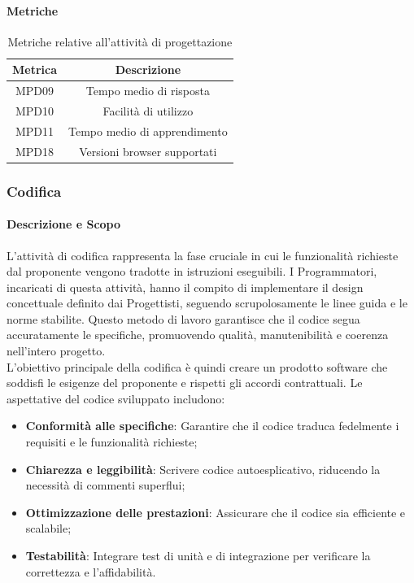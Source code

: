 \documentclass[10pt]{article}
\begin{document}
\begin{justify}
        \paragraph{Metriche}
        \begin{table}[H]
          \centering
          \begin{tabular}{|c|c|}
            \hline
            \textbf{Metrica} & \textbf{Descrizione} \\
            \hline
            MPD09 & Tempo medio di risposta\\
            \hline
            MPD10 & Facilità di utilizzo\\
            \hline
            MPD11 & Tempo medio di apprendimento\\
            \hline
            MPD18 & Versioni browser supportati\\
            \hline
          \end{tabular}
          \caption{Metriche relative all'attività di progettazione}
        \end{table}

    \subsubsection{Codifica}
    \label{codifica}
        \paragraph{Descrizione e Scopo}
        L'attività di codifica rappresenta la fase cruciale in cui le funzionalità richieste dal proponente vengono tradotte in istruzioni eseguibili. I Programmatori, incaricati di questa attività, hanno il compito di implementare il design concettuale definito dai Progettisti, seguendo scrupolosamente le linee guida e le norme stabilite. Questo metodo di lavoro garantisce che il codice segua accuratamente le specifiche, promuovendo qualità, manutenibilità e coerenza nell'intero progetto.\\
        L'obiettivo principale della codifica è quindi creare un prodotto software che soddisfi le esigenze del proponente e rispetti gli accordi contrattuali. Le aspettative del codice sviluppato includono:
        \begin{itemize}
            \item \textbf{Conformità alle specifiche}: Garantire che il codice traduca fedelmente i requisiti e le funzionalità richieste;
            \item \textbf{Chiarezza e leggibilità}: Scrivere codice autoesplicativo, riducendo la necessità di commenti superflui;
            \item \textbf{Ottimizzazione delle prestazioni}: Assicurare che il codice sia efficiente e scalabile;
            \item \textbf{Testabilità}: Integrare test di unità e di integrazione per verificare la correttezza e l'affidabilità.
        \end{itemize}


\end{justify}
\end{document}
